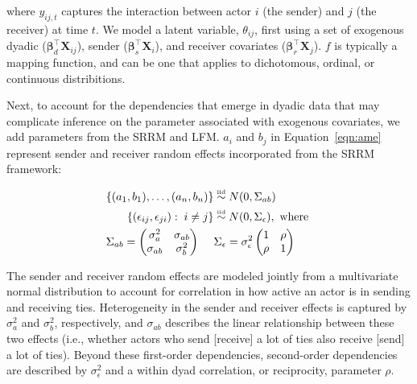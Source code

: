 where $y_{ij,t}$ captures the interaction between actor $i$ (the sender) and $j$ (the receiver) at time $t$. We model a latent variable, $\theta_{ij}$, first using a set of exogenous dyadic ($\bm\beta_{d}^{\top} \mathbf{X}_{ij}$), sender ($\bm\beta_{s}^{\top} \mathbf{X}_{i}$), and receiver covariates ($\bm\beta_{r}^{\top} \mathbf{X}_{j}$). $f$ is typically a mapping function, and can be one that applies to dichotomous, ordinal, or continuous distribitions.

Next, to account for the dependencies that emerge in dyadic data that may complicate inference on the parameter associated with exogenous covariates, we add parameters from the SRRM and LFM. $a_{i}$ and $b_{j}$ in Equation~\ref{eqn:ame} represent sender and receiver random effects incorporated from the SRRM framework:

\begin{align}
	\begin{aligned}
		\{ (a_{1}, b_{1}), \ldots, (a_{n}, b_{n}) \} &\simiid N(0,\Sigma_{ab}) \\ 
		\{ (\epsilon_{ij}, \epsilon_{ji}) : \; i \neq j\} &\simiid N(0,\Sigma_{\epsilon}), \text{ where } \\
		\Sigma_{ab} = \begin{pmatrix} \sigma_{a}^{2} & \sigma_{ab} \\ \sigma_{ab} & \sigma_{b}^2   \end{pmatrix} \;\;\;\;\; &\Sigma_{\epsilon} = \sigma_{\epsilon}^{2} \begin{pmatrix} 1 & \rho \\ \rho & 1  \end{pmatrix}
	\label{eqn:srm}
	\end{aligned}
\end{align}

The sender and receiver random effects are modeled jointly from a multivariate normal distribution to account for correlation in how active an actor is in sending and receiving ties. Heterogeneity in the sender and receiver effects is captured by $\sigma_{a}^{2}$ and $\sigma_{b}^{2}$, respectively, and $\sigma_{ab}$ describes the linear relationship between these two effects (i.e., whether actors who send [receive] a lot of ties also receive [send] a lot of ties). Beyond these first-order dependencies, second-order dependencies are described by $\sigma_{\epsilon}^{2}$ and a within dyad correlation, or reciprocity, parameter $\rho$. 

